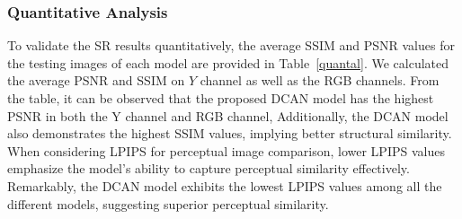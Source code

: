 \documentclass[conference]{IEEEtran}
\begin{document}
\subsubsection*{Quantitative Analysis}
To validate the SR results quantitatively, the average SSIM and PSNR values for the testing images of each model are provided in Table~\ref{quantal}. We calculated the average PSNR and SSIM on $Y$ channel as well as the RGB channels. From the table, it can be observed that the proposed DCAN model has the highest PSNR in both the Y channel and RGB channel, %
Additionally, the DCAN model also demonstrates the highest SSIM values, implying better structural similarity. When considering LPIPS for perceptual image comparison, lower LPIPS values emphasize the model's ability to capture perceptual similarity effectively. Remarkably, the DCAN model exhibits the lowest LPIPS values among all the different models, suggesting superior perceptual similarity. 
\end{document}
